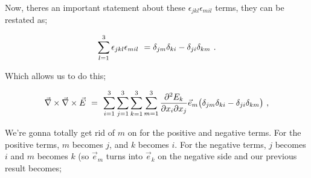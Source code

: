 \documentclass{article}
\begin{document}
Now, theres an important statement about these \begin{math} \epsilon_{jkl}\epsilon_{mil} \end{math} terms, they can be restated as;

\begin{equation} \label{eb-eq-51-39}
\sum_{l=1}^{3} \epsilon_{jkl}\epsilon_{mil} \hspace{0.125cm} = \delta_{jm}\delta_{ki} - \delta_{ji}\delta_{km} \hspace{0.125cm}.
\end{equation}

Which allows us to do this;

\begin{equation} \label{eb-eq-51-40}
\vec{\nabla}\times\vec{\nabla}\times\vec{E} \hspace{0.125cm} = \hspace{0.125cm} \sum_{i=1}^{3} \sum_{j=1}^{3} \sum_{k=1}^{3} \sum_{m=1}^{3} \frac{\partial^{2}{E_k}}{\partial{x_i}\partial{x_j}} \vec{e}_m \big(\delta_{jm}\delta_{ki} - \delta_{ji}\delta_{km}\big) \hspace{0.125cm} ,
\end{equation}

We're gonna totally get rid of \begin{math} m \end{math} on for the positive and negative terms. For the positive terms, \begin{math} m \end{math} becomes \begin{math} j \end{math}, and \begin{math} k \end{math} becomes \begin{math} i \end{math}. For the negative terms, \begin{math} j \end{math} becomes \begin{math} i \end{math} and \begin{math} m \end{math} becomes \begin{math} k \end{math} (so \begin{math} \vec{e}_m \end{math} turns into \begin{math} \vec{e}_k \end{math} on the negative side and our previous result becomes;
\end{document}
